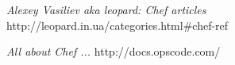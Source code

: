 \begin{thebibliography}{9}

  \emph{Alexey Vasiliev aka leopard: Chef articles}
  http://leopard.in.ua/categories.html\#chef-ref

  \emph{All about Chef ...}
  http://docs.opscode.com/

\end{thebibliography}